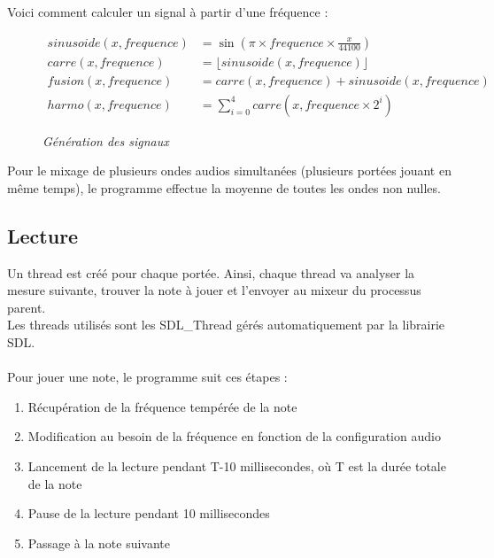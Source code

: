 \documentclass[12pt]{report}
\begin{document}
Voici comment calculer un signal à partir d'une fréquence :\\

\begin{figure}[H]
\centering
\[
\begin{aligned}
sinusoide(x, frequence) &  =  \sin(\pi\times \mathit{frequence}\times \frac{x}{44100}) \\
carre(x, frequence)  & =   \lfloor sinusoide(x, \mathit{frequence}) \rfloor   \\
fusion(x, frequence) & =  \mathit{carre}(x, \mathit{frequence}) + \mathit{sinusoide}(x, \mathit{frequence})  \\
harmo(x, frequence) & =  \sum_{i=0}^{4} \mathit{carre}(x, \mathit{frequence}\times 2^i)
\end{aligned}
 \]
\caption{\textit{Génération des signaux}}
\end{figure}

Pour le mixage de plusieurs ondes audios simultanées (plusieurs portées jouant en même temps), le programme effectue la moyenne de toutes les ondes non nulles.

\subsection{Lecture}
Un thread est créé pour chaque portée. Ainsi, chaque thread va analyser la mesure suivante, trouver la note à jouer et l'envoyer au mixeur du processus parent.\\
Les threads utilisés sont les SDL\_Thread gérés automatiquement par la librairie SDL.\\ \\
Pour jouer une note, le programme suit ces étapes :\\
\begin{enumerate}
 \item Récupération de la fréquence tempérée de la note \\
 \item Modification au besoin de la fréquence en fonction de la configuration audio\\
 \item Lancement de la lecture pendant T-10 millisecondes, où T est la durée totale de la note\\
 \item Pause de la lecture pendant 10 millisecondes\\
 \item Passage à la note suivante\\
\end{enumerate}
\end{document}
